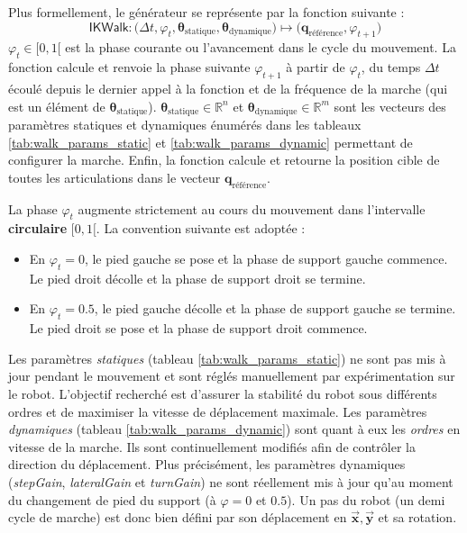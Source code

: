 Plus formellement, le générateur se 
représente par la fonction suivante :
$$
\mathsf{IKWalk} : 
\big(\Delta t, \varphi_{t}, \bm{\theta}_{\text{statique}}, \bm{\theta}_{\text{dynamique}}\big) 
\longmapsto 
\big(\bm{q}_{\text{référence}}, \varphi_{t+1}\big)
$$
$\varphi_{t} \in [0,1[$ est la phase courante ou l'avancement dans le cycle du mouvement.
La fonction calcule et renvoie la phase suivante $\varphi_{t+1}$ à partir de $\varphi_{t}$,
du temps $\Delta t$ écoulé depuis le dernier appel à la fonction et de la fréquence de la 
marche (qui est un élément de $\bm{\theta}_{\text{statique}}$).
$\bm{\theta}_{\text{statique}} \in \mathbb{R}^{n}$ et $\bm{\theta}_{\text{dynamique}} \in \mathbb{R}^{m}$ 
sont les vecteurs des paramètres statiques et dynamiques énumérés dans 
les tableaux \ref{tab:walk_params_static} et \ref{tab:walk_params_dynamic} permettant
de configurer la marche.
Enfin, la fonction calcule et retourne la position cible de toutes les articulations 
dans le vecteur $\bm{q}_{\text{référence}}$.

La phase $\varphi_{t}$ augmente strictement au cours du mouvement
dans l'intervalle \textbf{circulaire} $[0,1[$. La convention suivante est adoptée :
\begin{itemize}
    \item En $\varphi_{t} = 0$, le pied gauche se pose et 
        la phase de support gauche commence. 
        Le pied droit décolle et la phase de support droit se termine.
    \item En $\varphi_{t} = 0.5$, le pied gauche décolle et 
        la phase de support gauche se termine. 
        Le pied droit se pose et la phase de support droit commence.
\end{itemize}
Les paramètres \textit{statiques} (tableau \ref{tab:walk_params_static}) 
ne sont pas mis à jour pendant le mouvement et sont
réglés manuellement par expérimentation sur le robot.
L'objectif recherché est d'assurer la stabilité du robot 
sous différents ordres et de maximiser la vitesse de déplacement maximale. 
Les paramètres \textit{dynamiques} (tableau \ref{tab:walk_params_dynamic}) sont quant
à eux les \textit{ordres} en vitesse de la marche. 
Ils sont continuellement modifiés afin de contrôler la direction du déplacement.
Plus précisément, les paramètres dynamiques 
(\textit{stepGain}, \textit{lateralGain} et \textit{turnGain}) 
ne sont réellement mis à jour qu'au moment du changement de pied du 
support (à $\varphi = 0$ et $0.5$).
Un pas du robot (un demi cycle de marche) est donc bien défini
par son déplacement en $\bm{\vec{x}},\bm{\vec{y}}$ et sa rotation.\\

